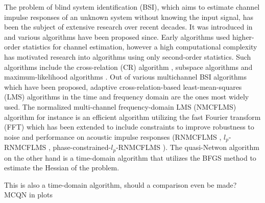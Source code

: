 \documentclass{article}
\begin{document}
The problem of blind system identification (BSI), which aims to estimate channel impulse responses of an unknown system without knowing the input signal, has been the subject of extensive research over recent decades.
It was introduced in \cite{satoMethodSelfRecoveringEqualization1975} and various algorithms have been proposed since.
Early algorithms used higher-order statistics \cite{godardSelfRecoveringEqualizationCarrier1980,tongNewApproachBlind1991,mendelTutorialHigherorderStatistics1991} for channel estimation, however a high computational complexity has motivated research into algorithms using only second-order statistics.
Such algorithms include the cross-relation (CR) algorithm \cite{langtongBlindIdentificationEqualization1994, guanghanxuLeastsquaresApproachBlind1995}, subspace algorithms \cite{moulinesSubspaceMethodsBlind1995,gannotSubspaceMethodsMultimicrophone2003,diamantarasEfficientSubspaceMethod2008,mayyalaStructureBasedSubspaceMethod2017} and maximum-likelihood algorithms \cite{yingbohuaFastMaximumLikelihood1996}.
Out of various multichannel BSI algorithms which have been proposed, adaptive cross-relation-based least-mean-squares (LMS) algorithms in the time and frequency domain are the ones most widely used.
The normalized multi-channel frequency-domain LMS (NMCFLMS) \cite{huangAdaptiveMultichannelLeast2002,huangClassFrequencydomainAdaptive2003} algorithm for instance is an efficient algorithm utilizing the fast Fourier transform (FFT) which has been extended to include constraints to improve robustness to noise and performance on acoustic impulse responses (RNMCFLMS \cite{huNoiseRobustBlind2015}, \(l_p\)-RNMCFLMS \cite{heNoiseRobustFrequencyDomain2018}, phase-constrained-\(l_p\)-RNMCFLMS \cite{joRobustBlindMultichannel2021}).
The quasi-Netwon algorithm \cite{habetsOnlineQuasiNewtonAlgorithm2010} on the other hand is a time-domain algorithm that utilizes the BFGS method to estimate the Hessian of the problem.
\begin{attention}
    This is also a time-domain algorithm, should a comparison even be made? MCQN in plots
\end{attention}
\end{document}
